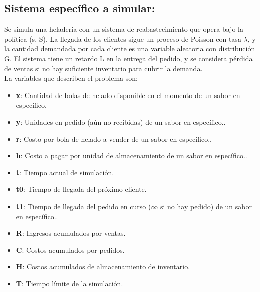 \documentclass[12pt,a4paper]{article}
\begin{document}
\begin{flushleft}
\subsection*{Sistema específico a simular:}
\noindent Se simula una heladería con un sistema de reabastecimiento que opera bajo la política (s, S). La llegada de los clientes sigue un proceso de Poisson con tasa $\lambda$, y la cantidad demandada por cada cliente es una variable aleatoria con distribución G. El sistema tiene un retardo L en la entrega del pedido, y se considera pérdida de ventas si no hay suficiente inventario para cubrir la demanda.\\
La variables que describen el problema son:
\begin{itemize}
\item \textbf{x}: Cantidad de bolas de helado disponible en el momento de un sabor en específico.
\item \textbf{y}: Unidades en pedido (aún no recibidas) de un sabor en específico..
\item \textbf{r}: Costo por bola de helado a vender de un sabor en específico..
\item \textbf{h}: Costo a pagar por unidad de almacenamiento de un sabor en específico..
\item \textbf{t}: Tiempo actual de simulación.
\item \textbf{t0}: Tiempo de llegada del próximo cliente.
\item \textbf{t1}: Tiempo de llegada del pedido en curso ($\infty$ si no hay pedido) de un sabor en específico..
\item \textbf{R}: Ingresos acumulados por ventas.
\item \textbf{C}: Costos acumulados por pedidos.
\item \textbf{H}: Costos acumulados de almacenamiento de inventario.
\item \textbf{T}: Tiempo límite de la simulación.
\end{itemize}


\end{flushleft}
\end{document}
